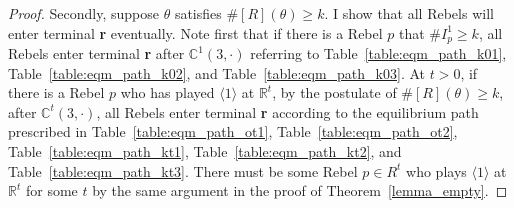 \documentclass[12pt,letter]{article}
\newcommand{\Kappa}{\mathbb{C}}
\newcommand{\Omicron}{\mathbb{R}}
\theoremstyle{definition}
\theoremstyle{remark}
\theoremstyle{claim}
\begin{document}
\begin{proof}
Secondly, suppose $\theta$ satisfies $\#[R](\theta)\geq k$. I show that all Rebels will enter terminal \textbf{r} eventually. Note first that if there is a Rebel $p$ that $\#I^1_p\geq k$, all Rebels enter terminal \textbf{r} after $\Kappa^1(3,\cdot)$ referring to Table~\ref{table:eqm_path_k01}, Table~\ref{table:eqm_path_k02}, and Table~\ref{table:eqm_path_k03}. At $t>0$, if there is a Rebel $p$ who has played $\langle 1 \rangle$ at $\Omicron^t$, by the postulate of $\#[R](\theta)\geq k$, after $\Kappa^t(3,\cdot)$, all Rebels enter terminal \textbf{r} according to the equilibrium path prescribed in Table~\ref{table:eqm_path_ot1}, Table~\ref{table:eqm_path_ot2}, Table~\ref{table:eqm_path_kt1}, Table~\ref{table:eqm_path_kt2}, and Table~\ref{table:eqm_path_kt3}. There must be some Rebel $p\in R^t$ who plays $\langle 1 \rangle$ at $\Omicron^t$ for some $t$ by the same argument in the proof of Theorem~\ref{lemma_empty}.
\end{proof}
\end{document}
